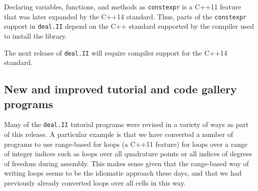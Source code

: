 \documentclass{ansarticle-preprint}
\newcommand{\specialword}[1]{\texttt{#1}}
\newcommand{\dealii}{{\specialword{deal.II}}\xspace}
\begin{document}
Declaring variables, functions, and methods as \texttt{constexpr}
is a C++11 feature that was later expanded by the C++14 standard.
Thus, parts of the \texttt{constexpr} support in \dealii{} depend on the C++
standard supported by the compiler used to install the library.

The next release of \dealii{} will require compiler support for the C++14 standard.


\subsection{New and improved tutorial and code gallery programs}
\label{subsec:steps}

Many of the \dealii{} tutorial programs were revised in a variety of
ways as part of this release. A particular example is that we have
converted a number of programs to use range-based for loops (a C++11
feature) for loops over a range of integer indices such as loops over
all quadrature points or all indices of degrees of freedom during
assembly. This makes sense given that the
range-based way of writing loops seems to be the idiomatic approach
these days, and that we had previously already converted loops over
all cells in this way.
\end{document}

